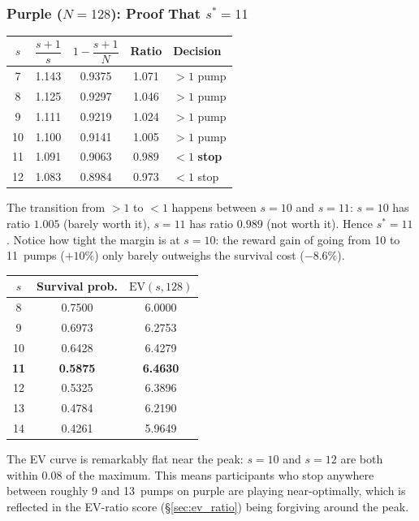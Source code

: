 \documentclass[11pt,a4paper]{article}
\begin{document}
\subsubsection*{Purple ($N = 128$): Proof That $s^* = 11$}

\begin{center}
\begin{tabular}{@{}ccccl@{}}
\toprule
$s$ & $\dfrac{s+1}{s}$ & $1 - \dfrac{s+1}{N}$ & Ratio & Decision \\[4pt]
\midrule
7  & 1.143 & 0.9375 & 1.071 & $> 1$ \;\;pump \\[2pt]
8  & 1.125 & 0.9297 & 1.046 & $> 1$ \;\;pump \\[2pt]
9  & 1.111 & 0.9219 & 1.024 & $> 1$ \;\;pump \\[2pt]
10 & 1.100 & 0.9141 & 1.005 & $> 1$ \;\;pump \\[2pt]
11 & 1.091 & 0.9063 & 0.989 & $< 1$ \;\;\textbf{stop} \\[2pt]
12 & 1.083 & 0.8984 & 0.973 & $< 1$ \;\;stop \\
\bottomrule
\end{tabular}
\end{center}

The transition from $> 1$ to $< 1$ happens between $s = 10$ and $s = 11$:
$s = 10$ has ratio $1.005$ (barely worth it), $s = 11$ has ratio $0.989$
(not worth it). Hence $s^* = 11$. Notice how tight the margin is at
$s = 10$: the reward gain of going from 10 to 11~pumps ($+10\%$) only
barely outweighs the survival cost ($-8.6\%$).

\begin{center}
\begin{tabular}{@{}ccc@{}}
\toprule
$s$ & Survival prob. & $\text{EV}(s, 128)$ \\
\midrule
8  & 0.7500 & 6.0000 \\
9  & 0.6973 & 6.2753 \\
10 & 0.6428 & 6.4279 \\
\textbf{11} & \textbf{0.5875} & \textbf{6.4630} \\
12 & 0.5325 & 6.3896 \\
13 & 0.4784 & 6.2190 \\
14 & 0.4261 & 5.9649 \\
\bottomrule
\end{tabular}
\end{center}

The EV curve is remarkably flat near the peak: $s = 10$ and $s = 12$
are both within $0.08$ of the maximum. This means participants who stop
anywhere between roughly 9 and 13~pumps on purple are playing
near-optimally, which is reflected in the EV-ratio score
(\S\ref{sec:ev_ratio}) being forgiving around the peak.
\end{document}
